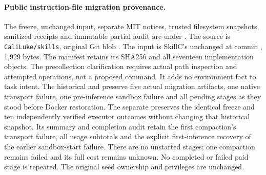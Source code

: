 \documentclass{article}
\theoremstyle{plain}
\theoremstyle{definition}
\newcommand{\id}[1]{\texttt{#1}}
\begin{document}
\paragraph{Public instruction-file migration provenance.}
The freeze, unchanged input, separate MIT notices, trusted filesystem snapshots,
sanitized receipts and immutable partial audit are under
.
The source is \id{CaliLuke/skills}, original Git blob
.
The input is SkillC's unchanged  at commit
, 1,929 bytes.
The manifest retains its SHA256 and all seventeen implementation objects.
The precollection clarification requires actual path inspection and attempted
operations, not a proposed command. It adds no environment fact to task intent.
The historical  and
 preserve five actual migration artifacts,
one native transport failure, one pre-inference sandbox failure and all pending
stages as they stood before Docker restoration. The separate
preserves the identical freeze and ten independently verified executor outcomes
without changing that historical snapshot. Its summary and completion audit
retain the first compaction's transport failure, all usage subtotals and the
explicit first-inference recovery of the earlier sandbox-start failure.
There are no unstarted stages; one compaction remains failed and its full cost
remains unknown. No completed or failed paid stage is repeated. The original
seed ownership and privileges are unchanged.
\end{document}
